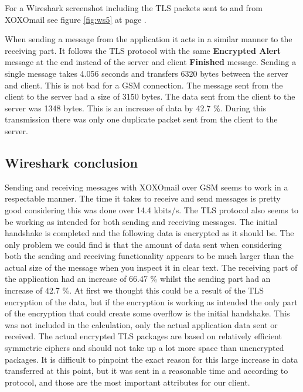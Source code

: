 For a Wireshark screenshot including the TLS packets sent to and from XOXOmail see figure \ref{fig:ws5} at page \pageref{fig:ws5}.
\newline

When sending a message from the application it acts in a similar manner to the receiving part. It follows the TLS protocol with the same \textbf{Encrypted Alert} message at the end instead of the server and client \textbf{Finished} message. 
\newline
\newline
Sending a single message takes 4.056 seconds and transfers 6320 bytes between the server and client. This is not bad for a GSM connection. The message sent from the client to the server had a size of 3150 bytes. The data sent from the client to the server was 1348 bytes.
This is an increase of data by 42.7 \%. During this transmission there was only one duplicate packet sent from the client to the server.


\subsection{Wireshark conclusion}
Sending and receiving messages with XOXOmail over GSM seems to work in a respectable manner. The time it takes to receive and send messages is pretty good considering this was done over 14.4 kbits/s. The TLS protocol also seems to be working as intended for both sending and receiving messages. The initial handshake is completed and the following data is encrypted as it should be. 
\newline
\newline
The only problem we could find is that the amount of data sent when considering both the sending and receiving functionality appears to be much larger than the actual size of the message when you inspect it in clear text. The receiving part of the application had an increase of 66.47 \% whilst the sending part had an increase of 42.7 \%. 
\newline
\newline
At first we thought this could be a result of the TLS encryption of the data, but if the encryption is working as intended the only part of the encryption that could create some overflow is the initial handshake. This was not included in the calculation, only the actual application data sent or received. The actual encrypted TLS packages are based on relatively efficient symmetric ciphers and should not take up a lot more space than unencrypted packages.  
\newline
\newline
It is difficult to pinpoint the exact reason for this large increase in data transferred at this point, but it was sent in a reasonable time and according to protocol, and those are the most important attributes for our client.  
